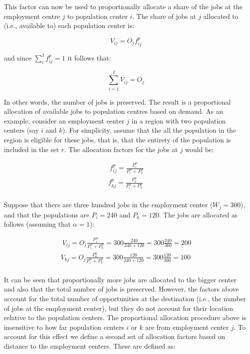 \documentclass[]{elsarticle} %
\begin{document}
This factor can now be used to proportionally allocate a share of the
jobs at the employment centre \(j\) to population center \(i\). The
share of jobs at \(j\) allocated to (i.e., available to) each population
center is:

\[
V_{ij} = O_jf^p_{ij}
\]

\noindent and since \(\sum_i^{I} f^p_{ij} = 1\) it follows that:

\[
\sum_{i=1}^I V_{ij} = O_j 
\]

In other words, the number of jobs is preserved. The result is a
proportional allocation of available jobs to population centres based on
demand. As an example, consider an employment center \(j\) in a region
with two population centers (say \(i\) and \(k\)). For simplicity,
assume that the all the population in the region is eligible for these
jobs, that is, that the entirety of the population is included in the
set \(r\). The allocation factors for the jobs at \(j\) would be:

\[
\begin{array}{l}\
f^p_{ij} = \frac{P_i ^\alpha}{P_i^\alpha + P_k^\alpha}\\
f^p_{kj} = \frac{P_k^\alpha}{P_i^\alpha + P_k^\alpha}\\
\end{array}
\]

Suppose that there are three hundred jobs in the employment center
(\(W_j = 300\)), and that the populations are \(P_i=240\) and
\(P_k=120\). The jobs are allocated as follows (assuming that
\(\alpha=1\)):

\[
\begin{array}{l}\
V_{ij} = O_j\frac{P_i^\alpha}{P_i^\alpha + P_k^\alpha} = 300\frac{240}{240 + 120} = 300\frac{240}{360} = 200\\
V_{kj} = O_j\frac{P_k^\alpha}{P_i^\alpha + P_k^\alpha} = 300\frac{120}{240 + 120} = 300\frac{120}{360} = 100 \\
\end{array}
\]

It can be seen that proportionally more jobs are allocated to the bigger
center and also that the total number of jobs is preserved. However, the
factors above account for the total number of opportunities at the
destination (i.e., the number of jobs at the employment center), but
they do not account for their location relative to the population
centers. The proportional allocation procedure above is insensitive to
how far population centers \(i\) or \(k\) are from employment center
\(j\). To account for this effect we define a second set of allocation
factors based on distance to the employment centers. These are defined
as:
\end{document}
